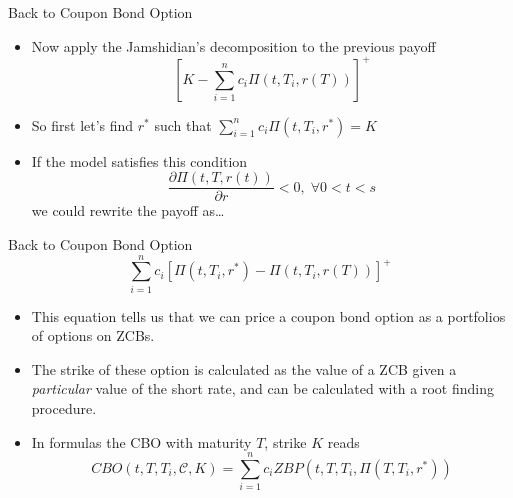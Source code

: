 \documentclass{beamer}
\begin{document}
\begin{frame}{Back to Coupon Bond Option}
	\begin{itemize}
		\item Now apply the Jamshidian's decomposition to the previous payoff
		\begin{equation*}
			\left[K-\sum_{i=1}^n c_i \Pi(t, T_i, r(T))\right]^+
		\end{equation*}
		\item So first let's find $r^*$ such that $\sum_{i=1}^n c_i \Pi(t, T_i, r^*) = K$
		\item If the model satisfies this condition
		\begin{equation*}
			\frac{\partial \Pi(t,T,r(t))}{\partial r}<0,\;\forall 0<t<s
		\end{equation*}
		we could rewrite the payoff as\ldots
		\end{itemize}
\end{frame}

\begin{frame}{Back to Coupon Bond Option}
	\begin{equation*}
		\sum_{i=1}^n c_i [\Pi(t, T_i, r^*)-\Pi(t, T_i, r(T))]^+
	\end{equation*}
	\begin{itemize}
		\item This equation tells us that we can price a coupon bond option as a portfolios of options on ZCBs.
		\item The strike of these option is calculated as the value of a ZCB given a \emph{particular} value of the short rate, and can be  calculated with a root finding procedure.
		\item In formulas the CBO with maturity $T$, strike $K$ reads
		\begin{equation}
			CBO(t,T,T_i,\mathcal{C},K) = \sum_{i=1}^n c_i ZBP(t,T,T_i,\Pi(T,T_i,r^*))
		\end{equation}
	\end{itemize}
\end{frame}
\end{document}
